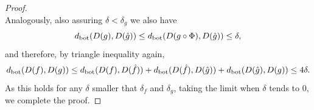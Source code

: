 \begin{proof}
\begin{equation}
    \end{equation}
    Analogously, also assuring $ \delta < \delta_g $ we also have
    \begin{equation}
        d_{\operatorname{bot}}(D(g), D(\hat g)) \leq d_{\operatorname{bot}}(D(g \circ \Phi), D(\hat g)) \leq \delta,
    \end{equation}
    and therefore, by triangle inequality again,
    \begin{equation}
        d_{\operatorname{bot}}(D(f), D(g)) \leq d_{\operatorname{bot}}(D(f), D(\hat f)) + d_{\operatorname{bot}}(D(\hat f), D(\hat g)) + d_{\operatorname{bot}}(D(\hat g), D(g)) \leq 4 \delta.
    \end{equation}
    As this holds for any $ \delta $ smaller that $ \delta_f $ and $ \delta_g $, taking the limit when $ \delta $ tends to $ 0 $, we complete the proof.
\end{proof}